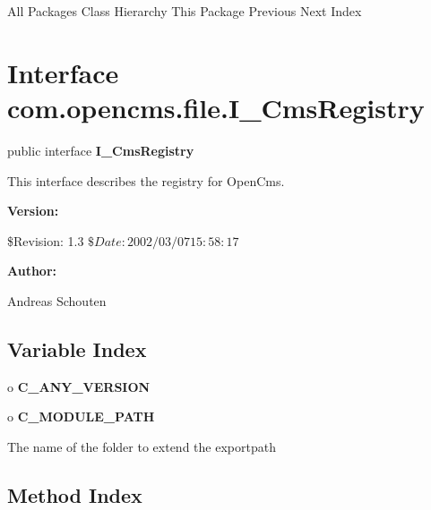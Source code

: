 \begin{PRE}
All Packages  Class Hierarchy  This Package  Previous  Next  Index
\end{PRE}

\htmlHR

\section*{  Interface com.opencms.file.I\_CmsRegistry }

\begin{description}
\item public interface {\bf I\_CmsRegistry} 
\end{description}

This interface describes the registry for OpenCms. 

\begin{description}
\item {\bf Version:}  

\$Revision: 1.3 $ \$Date: 2002/03/07 15:58:17 $  
\item {\bf Author:}  

Andreas Schouten 
\end{description}

\htmlHR

\subsection*{  Variable Index }

\begin{description}
\item o {\bf C\_ANY\_VERSION}  

\item o {\bf C\_MODULE\_PATH}  

The name of the folder to extend the exportpath 
\end{description}

\subsection*{  Method Index }

